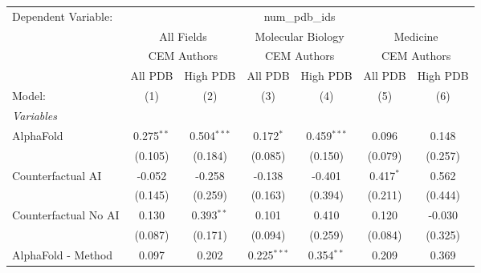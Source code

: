 \begingroup
\centering
\begin{tabular}{lcccccc}
   \tabularnewline \midrule \midrule
   Dependent Variable: & \multicolumn{6}{c}{num\_pdb\_ids}\\
 & \multicolumn{2}{c}{All Fields} & \multicolumn{2}{c}{Molecular Biology} & \multicolumn{2}{c}{Medicine} \\
\cmidrule(lr){2-3} \cmidrule(lr){4-5} \cmidrule(lr){6-7}
 & \multicolumn{2}{c}{CEM Authors} & \multicolumn{2}{c}{CEM Authors} & \multicolumn{2}{c}{CEM Authors} \\
\cmidrule(lr){2-3} \cmidrule(lr){4-5} \cmidrule(lr){6-7}
 & \multicolumn{1}{c}{All PDB} & \multicolumn{1}{c}{High PDB} & \multicolumn{1}{c}{All PDB} & \multicolumn{1}{c}{High PDB} & \multicolumn{1}{c}{All PDB} & \multicolumn{1}{c}{High PDB} \\
\cmidrule(lr){2-2} \cmidrule(lr){3-3} \cmidrule(lr){4-4} \cmidrule(lr){5-5} \cmidrule(lr){6-6} \cmidrule(lr){7-7}
   Model:                                                     & (1)          & (2)           & (3)           & (4)           & (5)           & (6)\\  
   \midrule
   \emph{Variables}\\
   AlphaFold                                                  & 0.275$^{**}$ & 0.504$^{***}$ & 0.172$^{*}$   & 0.459$^{***}$ & 0.096         & 0.148\\   
                                                              & (0.105)      & (0.184)       & (0.085)       & (0.150)       & (0.079)       & (0.257)\\   
   Counterfactual AI                                          & -0.052       & -0.258        & -0.138        & -0.401        & 0.417$^{*}$   & 0.562\\   
                                                              & (0.145)      & (0.259)       & (0.163)       & (0.394)       & (0.211)       & (0.444)\\   
   Counterfactual No AI                                       & 0.130        & 0.393$^{**}$  & 0.101         & 0.410         & 0.120         & -0.030\\   
                                                              & (0.087)      & (0.171)       & (0.094)       & (0.259)       & (0.084)       & (0.325)\\   
   AlphaFold - Method                                         & 0.097        & 0.202         & 0.225$^{***}$ & 0.354$^{**}$  & 0.209         & 0.369\\   

\end{tabular}
